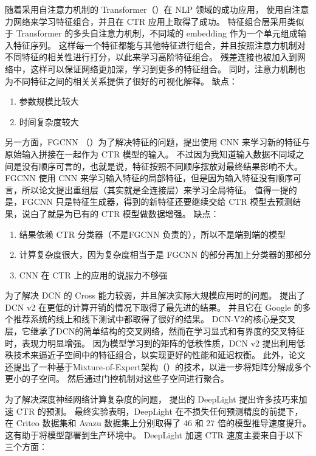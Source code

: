 \documentclass[degree=master,cjk-font=noto]{thuthesis}
\begin{document}
随着采用自注意力机制的 Transformer（\cite{self_attention}）在 NLP 领域的成功应用，\cite{autoint} 使用自注意力网络来学习特征组合，并且在 CTR 应用上取得了成功。
特征组合层采用类似于 Transformer 的多头自注意力机制，不同域的 embedding 作为一个单元组成输入特征序列。
这样每一个特征都能与其他特征进行组合，并且按照注意力机制对不同特征的相关性进行打分，以此来学习高阶特征组合。
残差连接也被加入到网络中，这样可以保证网络更加深，学习到更多的特征组合。
同时，注意力机制也为不同特征之间的相关关系提供了很好的可视化解释。
缺点：

\begin{enumerate}
  \item 参数规模比较大
  \item 时间复杂度较大
\end{enumerate}

另一方面，FGCNN （\cite{fgcnn}）为了解决特征的问题，提出使用 CNN 来学习新的特征与原始输入拼接在一起作为 CTR 模型的输入。
不过因为我知道输入数据不同域之间是没有顺序可言的，也就是说，特征按照不同顺序摆放对最终结果影响不大。
FGCNN 使用 CNN 来学习输入特征的局部特征，但是因为输入特征没有顺序可言，所以论文提出重组层（其实就是全连接层）来学习全局特征。
值得一提的是，FGCNN 只是特征生成器，得到的新特征还要继续交给 CTR 模型去预测结果，说白了就是为已有的 CTR 模型做数据增强。
缺点：

\begin{enumerate}
  \item 结果依赖 CTR 分类器（不是FGCNN 负责的），所以不是端到端的模型
  \item 计算复杂度很大，因为复杂度相当于是 FGCNN 的部分再加上分类器的那部分
  \item CNN 在 CTR 上的应用的说服力不够强
\end{enumerate}

为了解决 DCN 的 Cross 能力较弱，并且解决实际大规模应用时的问题。
\cite{dcn_v2} 提出了 DCN v2 在更低的计算开销的情况下取得了最先进的结果。
并且它在 Google 的多个推荐系统的线上和线下测试中都取得了很好的结果。
DCN-V2的核心是交叉层，它继承了DCN的简单结构的交叉网络，然而在学习显式和有界度的交叉特征时，表现力明显增强。
因为模型学习到的矩阵的低秩性质，DCN v2 提出利用低秩技术来逼近子空间中的特征组合，以实现更好的性能和延迟权衡。
此外，论文还提出了一种基于Mixture-of-Expert架构（\cite{mix_experts}）的技术，以进一步将矩阵分解成多个更小的子空间。
然后通过门控机制对这些子空间进行聚合。


为了解决深度神经网络计算复杂度的问题，\cite{deeplight} 提出的 DeepLight 提出许多技巧来加速 CTR 的预测。
最终实验表明，DeepLight 在不损失任何预测精度的前提下，在 Criteo 数据集和 Avazu 数据集上分别取得了 46 和 27 倍的模型推导速度提升。
这有助于将模型部署到生产环境中。
DeepLight 加速 CTR 速度主要来自于以下三个方面：
\end{document}

